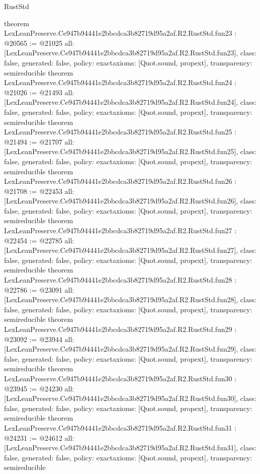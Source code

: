 \begin{lexlean}{RustStd}
\begin{coremodule}
{}
theorem LexLeanPreserve.Ce947b94441e2bbcdca3b82719d95a2af.R2.RustStd.fun23 : @20565 := @21025 {
  all: [LexLeanPreserve.Ce947b94441e2bbcdca3b82719d95a2af.R2.RustStd.fun23],
  class: false,
  generated: false,
  policy: exact{axioms: [Quot.sound, propext]},
  transparency: semireducible
}
theorem LexLeanPreserve.Ce947b94441e2bbcdca3b82719d95a2af.R2.RustStd.fun24 : @21026 := @21493 {
  all: [LexLeanPreserve.Ce947b94441e2bbcdca3b82719d95a2af.R2.RustStd.fun24],
  class: false,
  generated: false,
  policy: exact{axioms: [Quot.sound, propext]},
  transparency: semireducible
}
theorem LexLeanPreserve.Ce947b94441e2bbcdca3b82719d95a2af.R2.RustStd.fun25 : @21494 := @21707 {
  all: [LexLeanPreserve.Ce947b94441e2bbcdca3b82719d95a2af.R2.RustStd.fun25],
  class: false,
  generated: false,
  policy: exact{axioms: [Quot.sound, propext]},
  transparency: semireducible
}
theorem LexLeanPreserve.Ce947b94441e2bbcdca3b82719d95a2af.R2.RustStd.fun26 : @21708 := @22453 {
  all: [LexLeanPreserve.Ce947b94441e2bbcdca3b82719d95a2af.R2.RustStd.fun26],
  class: false,
  generated: false,
  policy: exact{axioms: [Quot.sound, propext]},
  transparency: semireducible
}
theorem LexLeanPreserve.Ce947b94441e2bbcdca3b82719d95a2af.R2.RustStd.fun27 : @22454 := @22785 {
  all: [LexLeanPreserve.Ce947b94441e2bbcdca3b82719d95a2af.R2.RustStd.fun27],
  class: false,
  generated: false,
  policy: exact{axioms: [Quot.sound, propext]},
  transparency: semireducible
}
theorem LexLeanPreserve.Ce947b94441e2bbcdca3b82719d95a2af.R2.RustStd.fun28 : @22786 := @23091 {
  all: [LexLeanPreserve.Ce947b94441e2bbcdca3b82719d95a2af.R2.RustStd.fun28],
  class: false,
  generated: false,
  policy: exact{axioms: [Quot.sound, propext]},
  transparency: semireducible
}
theorem LexLeanPreserve.Ce947b94441e2bbcdca3b82719d95a2af.R2.RustStd.fun29 : @23092 := @23944 {
  all: [LexLeanPreserve.Ce947b94441e2bbcdca3b82719d95a2af.R2.RustStd.fun29],
  class: false,
  generated: false,
  policy: exact{axioms: [Quot.sound, propext]},
  transparency: semireducible
}
theorem LexLeanPreserve.Ce947b94441e2bbcdca3b82719d95a2af.R2.RustStd.fun30 : @23945 := @24230 {
  all: [LexLeanPreserve.Ce947b94441e2bbcdca3b82719d95a2af.R2.RustStd.fun30],
  class: false,
  generated: false,
  policy: exact{axioms: [Quot.sound, propext]},
  transparency: semireducible
}
theorem LexLeanPreserve.Ce947b94441e2bbcdca3b82719d95a2af.R2.RustStd.fun31 : @24231 := @24612 {
  all: [LexLeanPreserve.Ce947b94441e2bbcdca3b82719d95a2af.R2.RustStd.fun31],
  class: false,
  generated: false,
  policy: exact{axioms: [Quot.sound, propext]},
  transparency: semireducible
}
\end{coremodule}
\end{lexlean}
